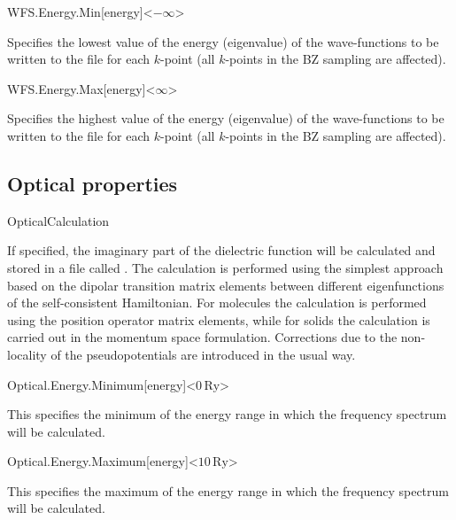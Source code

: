 \begin{fdfentry}{WFS.Energy.Min}[energy]<$-\infty$>
  
  Specifies the lowest value of the energy (eigenvalue) of the
  wave-functions to be written to the file
   for each $k$-point (all $k$-points in
  the BZ sampling are affected).

\end{fdfentry}

\begin{fdfentry}{WFS.Energy.Max}[energy]<$\infty$>
  
  Specifies the highest value of the energy (eigenvalue) of the
  wave-functions to be written to the file  for
  each $k$-point (all $k$-points in the BZ sampling are affected).

\end{fdfentry}




\subsection{Optical properties}

\begin{fdflogicalF}{OpticalCalculation}

  If specified, the imaginary part of the dielectric function will be
  calculated and stored in a file called . The
  calculation is performed using the simplest approach based on the
  dipolar transition matrix elements between different eigenfunctions
  of the self-consistent Hamiltonian. For molecules the calculation is
  performed using the position operator matrix elements, while for
  solids the calculation is carried out in the momentum space
  formulation. Corrections due to the non-locality of the
  pseudopotentials are introduced in the usual way.

\end{fdflogicalF}

\begin{fdfentry}{Optical.Energy.Minimum}[energy]<$0\,\mathrm{Ry}$>

  This specifies the minimum of the energy range in which the
  frequency spectrum will be calculated.

\end{fdfentry}

\begin{fdfentry}{Optical.Energy.Maximum}[energy]<$10\,\mathrm{Ry}$>

  This specifies the maximum of the energy range in which the
  frequency spectrum will be calculated.

\end{fdfentry}

